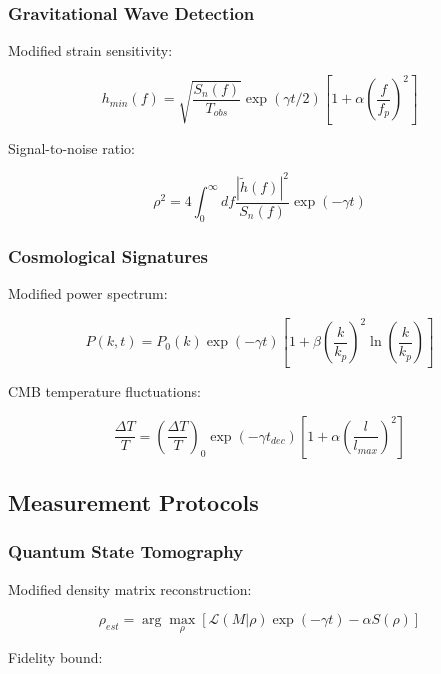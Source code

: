 \documentclass[12pt]{article}
\theoremstyle{plain}
\theoremstyle{definition}
\theoremstyle{remark}
\begin{document}
\subsubsection{Gravitational Wave Detection}

Modified strain sensitivity:

\begin{equation}
h_{min}(f) = \sqrt{\frac{S_n(f)}{T_{obs}}}\exp(\gamma t/2)\left[1 + \alpha\left(\frac{f}{f_p}\right)^2\right]
\end{equation}

Signal-to-noise ratio:

\begin{equation}
\rho^2 = 4\int_0^\infty df\frac{|\tilde{h}(f)|^2}{S_n(f)}\exp(-\gamma t)
\end{equation}

\subsubsection{Cosmological Signatures}

Modified power spectrum:

\begin{equation}
P(k,t) = P_0(k)\exp(-\gamma t)\left[1 + \beta\left(\frac{k}{k_p}\right)^2\ln\left(\frac{k}{k_p}\right)\right]
\end{equation}

CMB temperature fluctuations:

\begin{equation}
\frac{\Delta T}{T} = \left(\frac{\Delta T}{T}\right)_0\exp(-\gamma t_{dec})\left[1 + \alpha\left(\frac{l}{l_{max}}\right)^2\right]
\end{equation}

\subsection{Measurement Protocols}

\subsubsection{Quantum State Tomography}

Modified density matrix reconstruction:

\begin{equation}
\rho_{est} = \arg\max_\rho\left[\mathcal{L}(M|\rho)\exp(-\gamma t) - \alpha S(\rho)\right]
\end{equation}

Fidelity bound:
\end{document}
